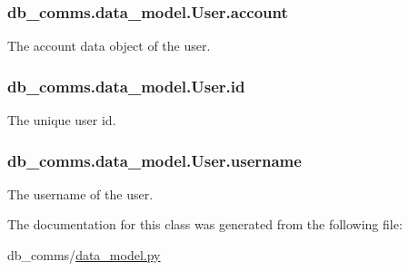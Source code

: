 \subsubsection[{account}]{\setlength{\rightskip}{0pt plus 5cm}db\+\_\+comms.\+data\+\_\+model.\+User.\+account}\label{classdb__comms_1_1data__model_1_1_user_a3f66468667b974cc58e40bccd940d593}


The account data object of the user. 

\hypertarget{classdb__comms_1_1data__model_1_1_user_a9616c67d1c09b22eafb5e8f585bc955f}{}
\subsubsection[{id}]{\setlength{\rightskip}{0pt plus 5cm}db\+\_\+comms.\+data\+\_\+model.\+User.\+id}\label{classdb__comms_1_1data__model_1_1_user_a9616c67d1c09b22eafb5e8f585bc955f}


The unique user id. 

\hypertarget{classdb__comms_1_1data__model_1_1_user_a1e0ac95a2b164936f0754bff42f8d315}{}
\subsubsection[{username}]{\setlength{\rightskip}{0pt plus 5cm}db\+\_\+comms.\+data\+\_\+model.\+User.\+username}\label{classdb__comms_1_1data__model_1_1_user_a1e0ac95a2b164936f0754bff42f8d315}


The username of the user. 



The documentation for this class was generated from the following file\+:\begin{DoxyCompactItemize}
\item 
db\+\_\+comms/\hyperlink{data__model_8py}{data\+\_\+model.\+py}\end{DoxyCompactItemize}
